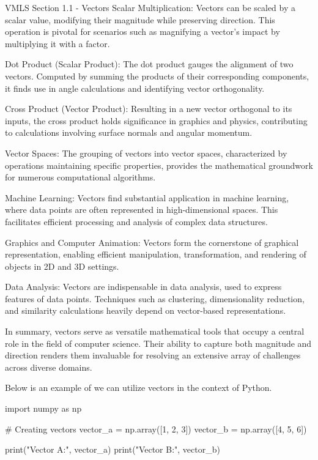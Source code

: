 \begin{notes}{VMLS Section 1.1 - Vectors}
    Scalar Multiplication: Vectors can be scaled by a scalar value, modifying their magnitude while preserving direction. This operation is pivotal for scenarios such as magnifying a vector's impact 
    by multiplying it with a factor.

    Dot Product (Scalar Product): The dot product gauges the alignment of two vectors. Computed by summing the products of their corresponding components, it finds use in angle calculations and 
    identifying vector orthogonality.

    Cross Product (Vector Product): Resulting in a new vector orthogonal to its inputs, the cross product holds significance in graphics and physics, contributing to calculations involving surface 
    normals and angular momentum.

    Vector Spaces: The grouping of vectors into vector spaces, characterized by operations maintaining specific properties, provides the mathematical groundwork for numerous computational algorithms.

    Machine Learning: Vectors find substantial application in machine learning, where data points are often represented in high-dimensional spaces. This facilitates efficient processing and analysis 
    of complex data structures.

    Graphics and Computer Animation: Vectors form the cornerstone of graphical representation, enabling efficient manipulation, transformation, and rendering of objects in 2D and 3D settings.

    Data Analysis: Vectors are indispensable in data analysis, used to express features of data points. Techniques such as clustering, dimensionality reduction, and similarity calculations heavily 
    depend on vector-based representations.

    In summary, vectors serve as versatile mathematical tools that occupy a central role in the field of computer science. Their ability to capture both magnitude and direction renders them invaluable 
    for resolving an extensive array of challenges across diverse domains.
    
    \begin{highlight}
        Below is an example of we can utilize vectors in the context of Python.

    \begin{code}[Python]
    import numpy as np

    # Creating vectors
    vector_a = np.array([1, 2, 3])
    vector_b = np.array([4, 5, 6])

    print("Vector A:", vector_a)
    print("Vector B:", vector_b)
    \end{code}
    \end{highlight}
\end{notes}

